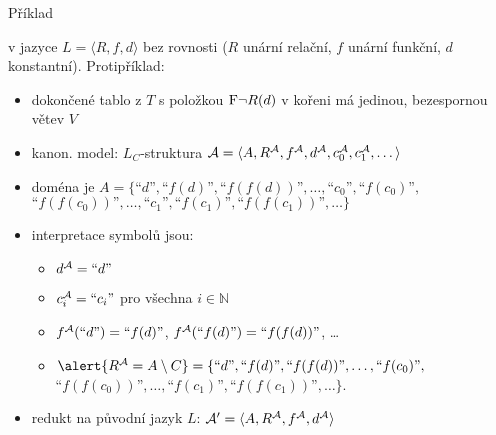 \documentclass{beamer}
\begin{document}
\begin{frame}{Příklad}

     v jazyce $L=\langle R,f,d \rangle$ bez rovnosti ($R$ unární relační, $f$ unární funkční, $d$ konstantní). Protipříklad: 

    \begin{itemize}
        \item dokončené tablo z $T$ s položkou $\mathrm{F}\neg R(d)$ v kořeni má jedinou, bezespornou větev $V$
        \item \alert{kanon. model:} $L_C$-struktura {$\mathcal{A}=\langle A,R^{\mathcal{A}},f^{\mathcal{A}},d^{\mathcal{A}},c_0^{\mathcal{A}},c_1^{\mathcal{A}},\dots\rangle$}
        \item doména je {$A=\{\text{``$d$''},\text{``$f(d)$''},\text{``$f(f(d))$''},\dots,\text{``$c_0$''},\text{``$f(c_0)$''},$ $\text{``$f(f(c_0))$''},\dots,\text{``$c_1$''},\text{``$f(c_1)$''},\text{``$f(f(c_1))$''},\dots\}$}
        \item interpretace symbolů jsou:
        \begin{itemize}
            \item $d^{\mathcal{A}}=\text{``$d$''}$
            \item $c^{\mathcal{A}}_i=\text{``$c_i$''}$ pro všechna $i\in \mathbb N$
            \item $f^{\mathcal{A}}(\text{``$d$''})=\text{``$f(d)$''}$, $f^{\mathcal{A}}(\text{``$f(d)$''})=\text{``$f(f(d))$''}$, \dots
            \item $\alert{R^\A=A\setminus C}=\{\text{``$d$''},\text{``$f(d)$''},\text{``$f(f(d))$''},\dots,\text{``$f(c_0)$''},$ $\text{``$f(f(c_0))$''},\dots,\text{``$f(c_1)$''},\text{``$f(f(c_1))$''},\dots\}$.
        \end{itemize}
        \item redukt na původní jazyk $L$: $\mathcal{A}'=\langle A, R^{\mathcal{A}}, f^{\mathcal{A}}, d^{\mathcal{A}}\rangle$
    \end{itemize}
        
\end{frame}
\end{document}
